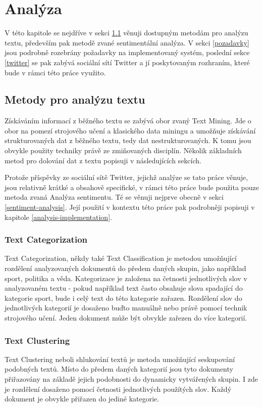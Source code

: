 \documentclass[thesis=B,czech]{FITthesis}[2012/06/26]
\begin{document}
\chapter{Analýza}
V této kapitole se nejdříve v sekci \ref{text-mining} věnuji dostupným metodám pro analýzu textu, především pak metodě zvané sentimentální analýza. V sekci \ref{pozadavky} jsou podrobně rozebrány požadavky na implementovaný systém, poslední sekce \ref{twitter} se pak zabývá sociální sítí Twitter a jí poskytovaným rozhraním, které bude v rámci této práce využito. 

\section{Metody pro analýzu textu}
\label{text-mining}
	Získáváním informací z běžného textu se zabývá obor zvaný Text Mining. Jde o obor na pomezí strojového učení a klasického data miningu a umožňuje získávání strukturovaných dat z běžného textu, tedy dat nestrukturovaných. K tomu jsou obvykle použity techniky právě ze zmiňovaných disciplín. Několik základních metod pro dolování dat z textu popisuji v následujících sekcích. 
	
	Protože příspěvky ze sociální sítě Twitter, jejichž analýze se tato práce věnuje, jsou relativně krátké a obsahově specifické, v rámci této práce bude použita pouze metoda zvaná Analýza sentimentu. Té se věnuji nejprve obecně v sekci \ref{sentiment-analysis}. Její použití v kontextu této práce pak podrobněji popisuji v kapitole \ref{analysis-implementation}. 
	
\subsection{Text Categorization}
	Text Categorization, někdy také Text Classification je metodou umožňující rozdělení analyzovaných dokumentů do předem daných skupin, jako například sport, politika a věda. Kategorizace je založena na četnosti jednotlivých slov v analyzovaném textu - pokud například text často obsahuje slova spadající do kategorie sport, bude i celý text do této kategorie zařazen. Rozdělení slov do jednotlivých kategorií je dosaženo buďto manuálně nebo právě pomocí technik strojového učení. Jeden dokument může být obvykle zařezen do více kategorií. 

\subsection{Text Clustering}
	Text Clustering neboli shlukování textů je metoda umožňující seskupování podobných textů. Místo do předem daných kategorií jsou tyto dokumenty přiřazovány na základě jejich podobnosti do dynamicky vytvářených skupin. I zde je rozdělení dosaženo pomocí četnosti jednotlivých použítých slov. Každý dokument je obvykle přiřazen do jediné kategorie. 
\end{document}
